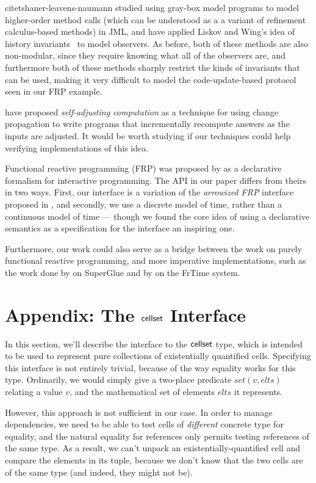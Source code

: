 \documentclass[preprint,natbib]{sigplanconf}
\begin{document}
citet{shaner-leavens-naumann} studied using gray-box model
programs to model higher-order method calls (which can be understood
as a a variant of refinement calculus-based methods) in JML, and 
\citet{history-invariants} have applied Liskov and Wing's
idea of history invariants~\cite{liskov-wing} to model observers. As
before, both of these methods are also non-modular, since they require
knowing what all of the observers are, and furthermore both of these
methods sharply restrict the kinds of invariants that can be used,
making it very difficult to model the code-update-based protocol seen
in our FRP example.

\citet{self-adjusting} have proposed
\emph{self-adjusting computation} as a technique for using change
propagation to write programs that incrementally
recompute answers as the inputs are adjusted. It would be worth 
studying if our techniques could help verifying implementations of this
idea.

Functional reactive programming (FRP) was proposed by \citet{frp} as a
declarative formalism for interactive programming. The API in our
paper differs from theirs in two ways. First, our interface is a
variation of the \emph{arrowized FRP} interface proposed in
\cite{afrp}, and secondly, we use a discrete model of time, rather
than a continuous model of time --- though we found the core idea of
using a declarative semantics as a specification for the interface an
inspiring one.

Furthermore, our work could also serve as a bridge between the work on
purely functional reactive programming, and more imperative
implementations, such as the work done by \citet{superglue} on
SuperGlue and by \citet{frtime} on the FrTime system.


\appendix

\section{Appendix: The $\mbox{\textsf{{cellset}}}$ Interface}

In this section, we'll describe the interface to the $\mbox{\textsf{{cellset}}}$ type,
which is intended to be used to represent pure collections of
existentially quantified cells. Specifying this interface is not
entirely trivial, because of the way equality works for this
type. Ordinarily, we would simply give a two-place predicate $set(v,
elts)$ relating a value $v$, and the mathematical set of elements
$elts$ it represents.

However, this approach is not sufficient in our case. In order to
manage dependencies, we need to be able to test cells of
\emph{different} concrete type for equality, and the natural equality
for references only permits testing references of the same type. As a
result, we can't unpack an existentially-quantified cell and compare
the elements in its tuple, because we don't know that the two cells
are of the same type (and indeed, they might not be). 
\end{document}
